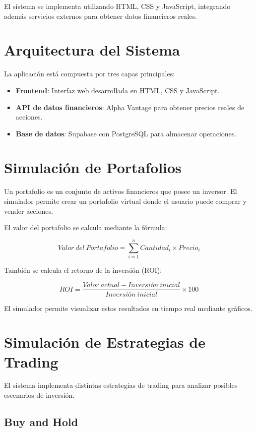 \documentclass[a4paper,12pt]{article}
\begin{document}
El sistema se implementa utilizando HTML, CSS y JavaScript, integrando además servicios externos para obtener datos financieros reales.

\section{Arquitectura del Sistema}

La aplicación está compuesta por tres capas principales:

\begin{itemize}
\item \textbf{Frontend}: Interfaz web desarrollada en HTML, CSS y JavaScript.
\item \textbf{API de datos financieros}: Alpha Vantage para obtener precios reales de acciones.
\item \textbf{Base de datos}: Supabase con PostgreSQL para almacenar operaciones.
\end{itemize}

\section{Simulación de Portafolios}

Un portafolio es un conjunto de activos financieros que posee un inversor. El simulador permite crear un portafolio virtual donde el usuario puede comprar y vender acciones.

El valor del portafolio se calcula mediante la fórmula:

\[
Valor\ del\ Portafolio = \sum_{i=1}^{n} Cantidad_i \times Precio_i
\]

También se calcula el retorno de la inversión (ROI):

\[
ROI = \frac{Valor\ actual - Inversión\ inicial}{Inversión\ inicial} \times 100
\]

El simulador permite visualizar estos resultados en tiempo real mediante gráficos.

\section{Simulación de Estrategias de Trading}

El sistema implementa distintas estrategias de trading para analizar posibles escenarios de inversión.

\subsection{Buy and Hold}
\end{document}
